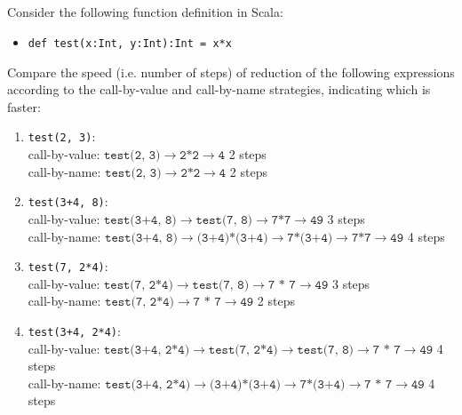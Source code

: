 \subsection{}

Consider the following function definition in Scala:
\begin{itemize}
	\item \texttt{def test(x:Int, y:Int):Int = x*x}
\end{itemize}
Compare the speed (i.e. number of steps) of reduction of the following
expressions according to the call-by-value and call-by-name strategies,
indicating which is faster:
\begin{enumerate}
	\item \texttt{test(2, 3)}:\\
	      call-by-value: $\texttt{test(2, 3)} \to \texttt{2*2} \to \texttt{4}$ 2 steps\\
	      call-by-name: $\texttt{test(2, 3)} \to \texttt{2*2} \to \texttt{4}$ 2 steps
	\item \texttt{test(3+4, 8)}:\\
	      call-by-value: $\texttt{test(3+4, 8)} \to \texttt{test(7, 8)} \to \texttt{7*7} \to \texttt{49}$ 3 steps\\
	      call-by-name: $\texttt{test(3+4, 8)} \to \texttt{(3+4)*(3+4)} \to \texttt{7*(3+4)} \to \texttt{7*7} \to \texttt{49}$ 4 steps
	\item \texttt{test(7, 2*4)}:\\
	      call-by-value: $\texttt{test(7, 2*4)} \to \texttt{test(7, 8)} \to \texttt{7 * 7} \to \texttt{49}$ 3 steps\\
	      call-by-name: $\texttt{test(7, 2*4)} \to \texttt{7 * 7} \to \texttt{49}$ 2 steps
	\item \texttt{test(3+4, 2*4)}:\\
	      call-by-value: $\texttt{test(3+4, 2*4)} \to \texttt{test(7, 2*4)} \to \texttt{test(7, 8)} \to \texttt{7 * 7} \to \texttt{49}$ 4 steps\\
	      call-by-name: $\texttt{test(3+4, 2*4)} \to \texttt{(3+4)*(3+4)} \to \texttt{7*(3+4)} \to \texttt{7 * 7} \to \texttt{49}$ 4 steps
\end{enumerate}
